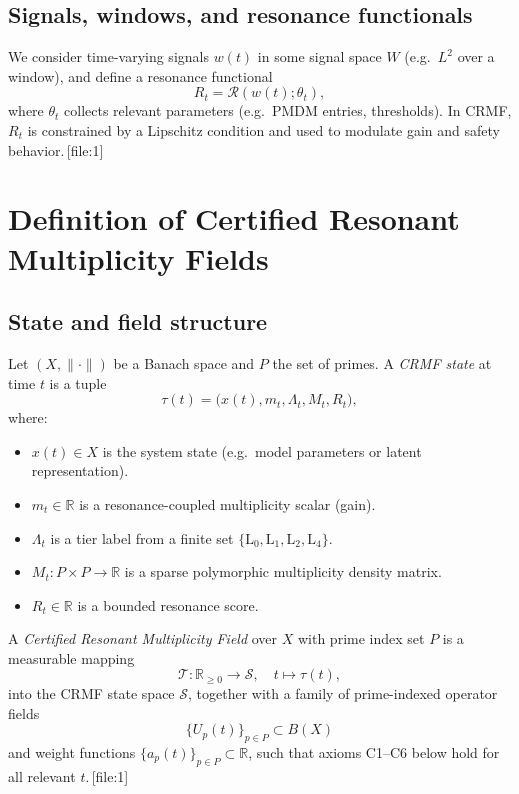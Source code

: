 \documentclass[11pt]{article}
\begin{document}
\subsection{Signals, windows, and resonance functionals}

We consider time-varying signals $w(t)$ in some signal space $W$ (e.g.\ $L^2$ over a window), and define a resonance functional
\[
  R_t = \mathcal{R}(w(t); \theta_t),
\]
where $\theta_t$ collects relevant parameters (e.g.\ PMDM entries, thresholds).
In CRMF, $R_t$ is constrained by a Lipschitz condition and used to modulate gain and safety behavior.\,[file:1]

\section{Definition of Certified Resonant Multiplicity Fields}

\subsection{State and field structure}

\begin{definition}
Let $(X, \|\cdot\|)$ be a Banach space and $P$ the set of primes.
A \emph{CRMF state} at time $t$ is a tuple
\[
  \tau(t) = \bigl(x(t), m_t, \Lambda_t, M_t, R_t\bigr),
\]
where:
\begin{itemize}[leftmargin=1.5em]
  \item $x(t) \in X$ is the system state (e.g.\ model parameters or latent representation).
  \item $m_t \in \mathbb{R}$ is a resonance-coupled multiplicity scalar (gain).
  \item $\Lambda_t$ is a tier label from a finite set $\{\mathrm{L}_0, \mathrm{L}_1, \mathrm{L}_2, \mathrm{L}_4\}$.
  \item $M_t : P \times P \to \mathbb{R}$ is a sparse polymorphic multiplicity density matrix.
  \item $R_t \in \mathbb{R}$ is a bounded resonance score.
\end{itemize}
\end{definition}

\begin{definition}
A \emph{Certified Resonant Multiplicity Field} over $X$ with prime index set $P$ is a measurable mapping
\[
  \mathcal{T} : \mathbb{R}_{\geq 0} \to \mathcal{S}, \quad t \mapsto \tau(t),
\]
into the CRMF state space $\mathcal{S}$, together with a family of prime-indexed operator fields
\[
  \{U_p(t)\}_{p \in P} \subset B(X)
\]
and weight functions $\{a_p(t)\}_{p \in P} \subset \mathbb{R}$, such that axioms C1--C6 below hold for all relevant $t$.\,[file:1]
\end{definition}
\end{document}
